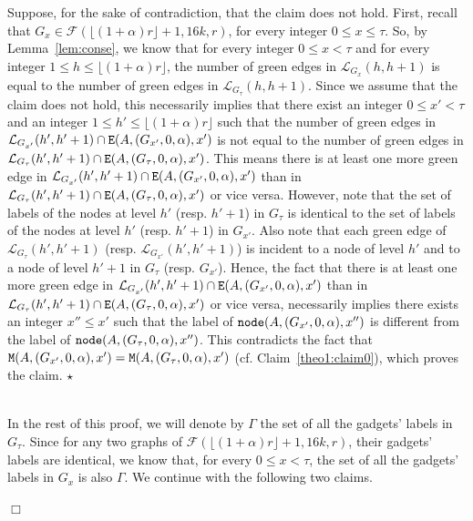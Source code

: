 \documentclass[11pt]{article}
\newcommand{\qed}{\hfill $\Box$ \bigbreak}
\newenvironment{proof}{\noindent {\bf Proof.}}{\qed}
\newenvironment{proofclaim}{\noindent{\bf Proof of the claim.}}{\hfill$\star$}
\begin{document}
{\begin{proof}
\begin{proofclaim}
  Suppose, for the sake of contradiction, that the claim does not
  hold. First, recall that
  $G_x\in\mathcal{F}(\lfloor(1+\alpha)r\rfloor+1,16k,r)$, for every
  integer $0\leq x \leq\tau$. So, by Lemma~\ref{lem:conse}, we know that
  for every integer $0\leq x<\tau$ and for every integer $1\leq h \leq
  \lfloor(1+\alpha)r\rfloor$, the number of green edges in
  $\mathcal{L}_{G_{x}}(h,h+1)$ is equal to the number of green edges
  in $\mathcal{L}_{G_{\tau}}(h,h+1)$. Since we assume that the claim
  does not hold, this necessarily implies that there exist an integer
  $0\leq x'<\tau$ and an integer $1\leq h' \leq
  \lfloor(1+\alpha)r\rfloor$ such that the number of green edges in
  $\mathcal{L}_{G_{x'}}(h',h'+1)\cap{\tt E}(A,(G_{x'},0,\alpha),x')$
  is not equal to the number of green edges in
  $\mathcal{L}_{G_{\tau}}(h',h'+1)\cap{\tt
    E}(A,(G_{\tau},0,\alpha),x')$. This means there is at least one
  more green edge in $\mathcal{L}_{G_{x'}}(h',h'+1)\cap{\tt
    E}(A,(G_{x'},0,\alpha),x')$ than in
  $\mathcal{L}_{G_{\tau}}(h',h'+1)\cap{\tt
    E}(A,(G_{\tau},0,\alpha),x')$ or vice versa. However, note that
  the set of labels of the nodes at level $h'$ (resp. $h'+1$) in
  $G_{\tau}$ is identical to the set of labels of the nodes at level
  $h'$ (resp. $h'+1$) in $G_{x'}$. Also note that each green edge of
  $\mathcal{L}_{G_{\tau}}(h',h'+1)$
  (resp. $\mathcal{L}_{G_{x'}}(h',h'+1)$) is incident to a node of
  level $h'$ and to a node of level $h'+1$ in $G_{\tau}$
  (resp. $G_{x'}$). Hence, the fact that there is at least one more
  green edge in $\mathcal{L}_{G_{x'}}(h',h'+1)\cap{\tt
    E}(A,(G_{x'},0,\alpha),x')$ than in
  $\mathcal{L}_{G_{\tau}}(h',h'+1)\cap{\tt
    E}(A,(G_{\tau},0,\alpha),x')$ or vice versa, necessarily implies
  there exists an integer $x''\leq x'$ such that the label of ${\tt
    node}(A,(G_{x'},0,\alpha),x'')$ is different from the label of
  ${\tt node}(A,(G_{\tau},0,\alpha),x'')$. This contradicts the fact
  that ${\tt M}(A,(G_{x'},0,\alpha),x')={\tt
    M}(A,(G_\tau,0,\alpha),x')$ (cf. Claim~\ref{theo1:claim0}), which
  proves the claim.
\end{proofclaim}

~~\\
In the rest of this proof, we will denote by $\Gamma$ the set of all the gadgets' labels in $G_{\tau}$. Since for any two graphs of $\mathcal{F}(\lfloor(1+\alpha)r\rfloor+1,16k,r)$, their gadgets' labels are identical, we know that, for every $0\leq x <\tau$, the set of all the gadgets' labels in $G_{x}$ is also $\Gamma$. We continue with the following two claims.


\end{proof}}
\end{document}
